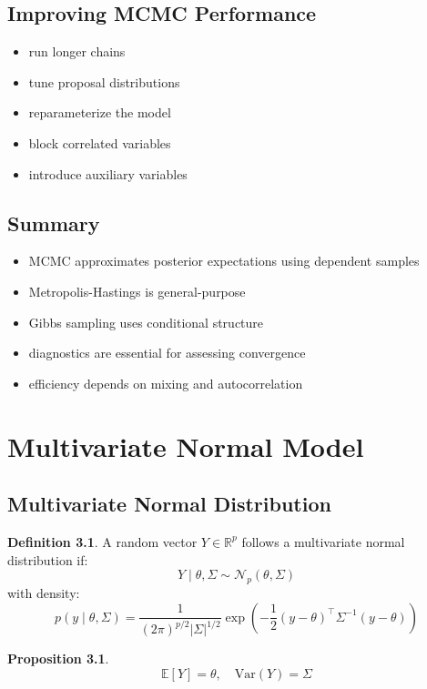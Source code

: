 \documentclass[12pt,oneside]{book}
\numberwithin{equation}{section}
\theoremstyle{definition}
\newtheorem{definition}{Definition}[section]
\theoremstyle{plain}
\newtheorem{proposition}{Proposition}[section]
\theoremstyle{remark}
\newcommand{\R}{\mathbb{R}}
\newcommand{\E}{\mathbb{E}}
\newcommand{\Var}{\mathrm{Var}}
\newcommand{\Normal}{\mathcal{N}}
\begin{document}
\section{Improving MCMC Performance}

\begin{itemize}
\item run longer chains
\item tune proposal distributions
\item reparameterize the model
\item block correlated variables
\item introduce auxiliary variables
\end{itemize}

\section{Summary}

\begin{itemize}
\item MCMC approximates posterior expectations using dependent samples
\item Metropolis-Hastings is general-purpose
\item Gibbs sampling uses conditional structure
\item diagnostics are essential for assessing convergence
\item efficiency depends on mixing and autocorrelation
\end{itemize}

\chapter{Multivariate Normal Model}

\section{Multivariate Normal Distribution}

\begin{definition}
A random vector $Y \in \R^p$ follows a multivariate normal distribution if:
$$
Y \mid \theta, \Sigma \sim \Normal_p(\theta, \Sigma)
$$
with density:
$$
p(y \mid \theta, \Sigma)
=
\frac{1}{(2\pi)^{p/2} |\Sigma|^{1/2}}
\exp\left(
-\frac{1}{2}(y - \theta)^\top \Sigma^{-1} (y - \theta)
\right)
$$
\end{definition}

\begin{proposition}
$$
\E[Y] = \theta, \quad \Var(Y) = \Sigma
$$
\end{proposition}
\end{document}

